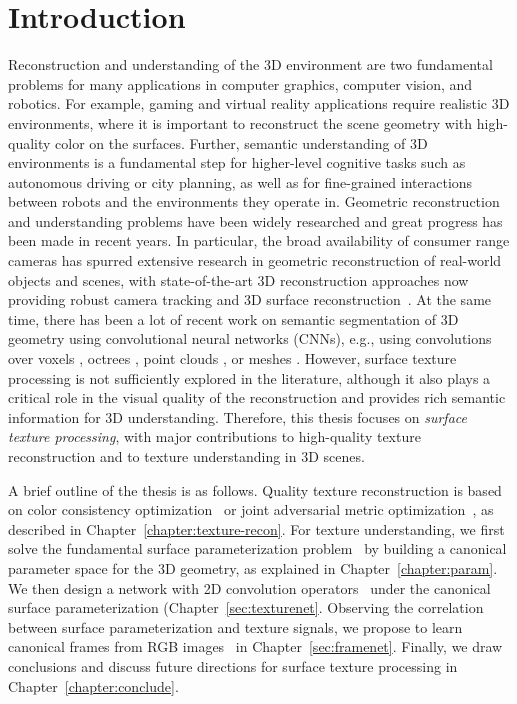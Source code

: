 \chapter{Introduction}
Reconstruction and understanding of the 3D environment are two fundamental problems for many applications in computer graphics, computer vision, and robotics.
%
For example, gaming and virtual reality applications require realistic 3D environments, where it is important to reconstruct the scene geometry with high-quality color on the surfaces. Further, semantic understanding of 3D environments is a fundamental step for higher-level cognitive tasks such as autonomous driving or city planning, as well as for fine-grained interactions between robots and the environments they operate in.
%
Geometric reconstruction and understanding problems have been widely researched and great progress has been made in recent years.
%
In particular, the broad availability of consumer range cameras has spurred extensive research in geometric reconstruction of real-world objects and scenes, with state-of-the-art 3D reconstruction approaches now providing robust camera tracking and 3D surface reconstruction~\cite{newcombe2011kinectfusion,izadi2011kinectfusion,whelan2015elasticfusion,dai2017bundlefusion}. At the same time, there has been a lot of recent work on semantic segmentation of 3D geometry using convolutional neural networks (CNNs), e.g., using convolutions over voxels \cite{wu20153d,maturana2015voxnet,qi2016volumetric,song2017semantic,dai2017scannet,dai2018scancomplete}, octrees \cite{riegler2017octnet}, point clouds \cite{qi2017pointnet,qi2017pointnet++}, or meshes  \cite{masci2015geodesic}.
%
However, surface texture processing is not sufficiently explored in the literature, although it also plays a critical role in the visual quality of the reconstruction and provides rich semantic information for 3D understanding.
%
Therefore, this thesis focuses on \textit{surface texture processing}, with major contributions to high-quality texture reconstruction and to texture understanding in 3D scenes.

A brief outline of the thesis is as follows. Quality texture reconstruction is based on color consistency optimization~\cite{huang20173dlite} or joint adversarial metric optimization~\cite{huang2020adversarial}, as described in Chapter~\ref{chapter:texture-recon}. For texture understanding, we first solve the fundamental surface parameterization problem~\cite{huang2018quadriflow} by building a canonical parameter space for the 3D geometry, as explained in Chapter~\ref{chapter:param}. We then design a network with 2D convolution operators~\cite{huang2018texturenet} under the canonical surface parameterization (Chapter~\ref{sec:texturenet}. Observing the correlation between surface parameterization and texture signals, we propose to learn canonical frames from RGB images~\cite{framenet} in Chapter~\ref{sec:framenet}. Finally, we draw conclusions and discuss future directions for surface texture processing in Chapter~\ref{chapter:conclude}.

